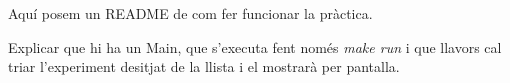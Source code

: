 
Aquí posem un README de com fer funcionar la pràctica.

Explicar que hi ha un Main, que s'executa fent només \emph{make run} i que llavors cal triar l'experiment desitjat de la llista i el mostrarà per pantalla.